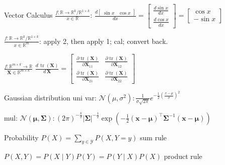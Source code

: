 \documentclass[UTF8,a4paper]{article}
\begin{document}
\begin{multicols}{3}
\begin{cheatsheetblock}{Vector Calculus}
    $\frac{f: \mathbb{R} \rightarrow \mathbb{R}^k / \mathbb{R}^{1 \times k}}{x \in \mathbb{R}}$: \hfill
    $\frac{d\left[\begin{array}{ll}
                    \sin x & \cos x
                \end{array}\right]}{d x}=\left[\begin{array}{l}
                \frac{d \sin x}{d x} \\
                \frac{d \cos x}{d x}
            \end{array}\right]=\left[\begin{array}{c}
                \cos x \\
                -\sin x
            \end{array}\right]$

    $\frac{f: \mathbb{R} \rightarrow \mathbb{R}^k / \mathbb{R}^{1 \times k}}{x \in \mathbb{R}^m}$: \hfill
    apply 2, then apply 1; cal; convert back.

    $\frac{f: \mathbb{R}^{m \times k} \rightarrow \mathbb{R}}{\bm{X} \in \mathbb{R}^{m \times k}}$ \hfill
    $\frac{d\, \operatorname{tr}(\bm{X})}{d\, \bm{X}} = \begin{bmatrix}
            \frac{\partial \operatorname{tr} (\bm{X})}{\partial \bm{X}_{11}} & \frac{\partial \operatorname{tr} (\bm{X})}{\partial \bm{X}_{12}} \\
            \frac{\partial \operatorname{tr} (\bm{X})}{\partial \bm{X}_{21}} & \frac{\partial \operatorname{tr} (\bm{X})}{\partial \bm{X}_{22}}
        \end{bmatrix}$
\end{cheatsheetblock}

\begin{cheatsheetblock}{Gaussian distribution}
    uni var: \hfill $\mathcal{N}\left(\mu, \sigma^2\right): \frac{1}{\sigma \sqrt{2 \pi}} e^{-\frac{1}{2}\left(\frac{x-\mu}{\sigma}\right)^2}$

    mul: \hfill $\mathcal{N}\left(\boldsymbol{\mu}, \boldsymbol{\Sigma}\right): (2\pi)^{-\frac{k}{2}}|\boldsymbol{\Sigma}|^{-\frac{1}{2}} \exp \left(-\frac{1}{2}(\boldsymbol{x}-\boldsymbol{\mu})^{\top} \boldsymbol{\Sigma}^{-1}(\boldsymbol{x}-\boldsymbol{\mu})\right)$
\end{cheatsheetblock}

\begin{cheatsheetblock}{Probability}
    $P(X)=\sum_{y \in \mathscr{Y}} P(X, Y=y)$ \hfill sum rule

    $P(X, Y)=P(X \mid Y) P(Y)=P(Y \mid X) P(X)$ \hfill product rule


\end{cheatsheetblock}
\end{multicols}
\end{document}
